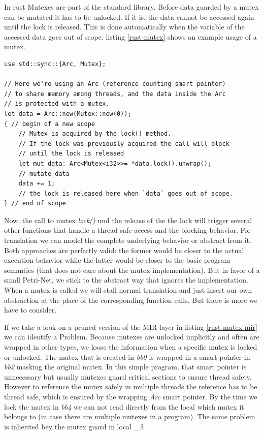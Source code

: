 In rust Mutexes are part of the standard library.
Before data guarded by a mutex can be mutated it has to be unlocked.
If it is, the data cannot be accessed again until the lock is released.
This is done automatically when the variable of the accessed data goes out of scope.
listing \ref{rust-mutex} shows an example usage of a mutex.

\begin{lstlisting}
use std::sync::{Arc, Mutex};

// Here we're using an Arc (reference counting smart pointer)
// to share memory among threads, and the data inside the Arc
// is protected with a mutex.
let data = Arc::new(Mutex::new(0));
{ // begin of a new scope
    // Mutex is acquired by the lock() method.
    // If the lock was previously acquired the call will block
    // until the lock is released
    let mut data: Arc<Mutex<i32>>= *data.lock().unwrap();
    // mutate data
    data += 1;
    // the lock is released here when `data` goes out of scope.
} // end of scope
\end{lstlisting}

Now, the call to mutex \textit{lock()} und the release of the the lock will trigger several other functions that handle a thread safe access and the blocking behavior.
For translation we can model the complete underlying behavior or abstract from it.
Both approaches are perfectly valid: the former would be closer to the actual execution behavior while the latter would be closer to the basic program semantics (that does not care about the mutex implementation).
But in favor of a small Petri-Net, we stick to the abstract way that ignores the implementation.
When a mutex is called we will stall normal translation and just insert our own abstraction at the place of the corresponding function calls.
But there is more we have to consider.

If we take a look on a pruned version of the MIR layer in listing \ref{rust-mutex-mir} we can identify a Problem.
Because mutexes are unlocked implicitly and often are wrapped in other types, we loose the information when a specific mutex is locked or unlocked.
The mutex that is created in \textit{bb0} is wrapped in a smart pointer in \textit{bb2} masking the original mutex.
In this simple program, that smart pointer is unnecessary but usually mutexes guard critical sections to ensure thread safety.
However to reference the mutex safely in multiple threads the reference has to be thread safe, which is ensured by the wrapping \textit{Arc} smart pointer.
By the time we lock the mutex in \textit{bb4} we can not read directly from the local which mutex it belongs to (in case there are multiple mutexes in a program).
The same problem is inherited bey the mutex guard in local \textit{\_3}.

